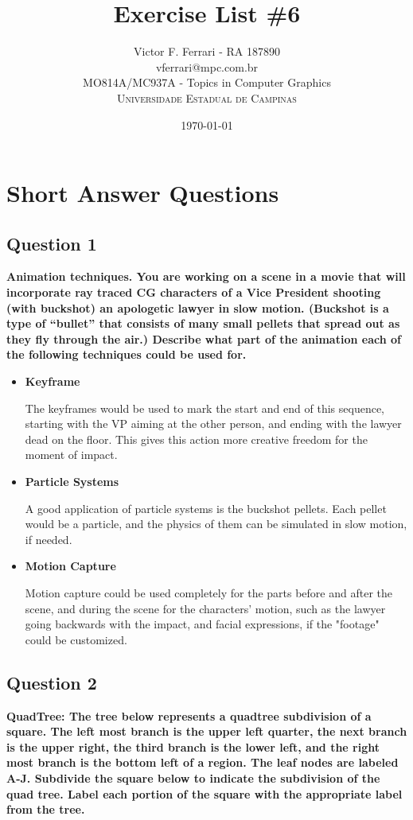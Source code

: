 \documentclass[12pt]{article}
\title{Exercise List \#6} %
\author{Victor F. Ferrari - RA 187890\\ %
vferrari@mpc.com.br\\
MO814A/MC937A - Topics in Computer Graphics\\ %
\textsc{Universidade Estadual de Campinas}
}
\date{\today} %
\begin{document}
\setlength{\droptitle}{-5em}    
\maketitle


\section{Short Answer Questions}

\subsection*{Question 1}
{\bfseries Animation techniques. You are working on a scene in a movie that will incorporate ray traced CG characters of a Vice President shooting (with buckshot) an apologetic lawyer in slow motion. (Buckshot is a type of “bullet” that consists of many small pellets that spread out as they fly through the air.) Describe what part of the animation each of the following techniques could be used for.}
\begin{itemize}
    \item \textbf{Keyframe}
    
    The keyframes would be used to mark the start and end of this sequence, starting with the VP aiming at the other person, and ending with the lawyer dead on the floor. This gives this action more creative freedom for the moment of impact.
    
    \item \textbf{Particle Systems}
    
    A good application of particle systems is the buckshot pellets. Each pellet would be a particle, and the physics of them can be simulated in slow motion, if needed.
    
    \item \textbf{Motion Capture}
    
    Motion capture could be used completely for the parts before and after the scene, and during the scene for the characters' motion, such as the lawyer going backwards with the impact, and facial expressions, if the "footage" could be customized.
\end{itemize}

\subsection*{Question 2}
{\bfseries QuadTree: The tree below represents a quadtree subdivision of a square. The left most branch is the upper left quarter, the next branch is the upper right, the third branch is the lower left, and the right most branch is the bottom left of a region. The leaf nodes are labeled A-J. Subdivide the square below to indicate the subdivision of the quad tree. Label each portion of the square with the appropriate label from the tree.}
\end{document}
